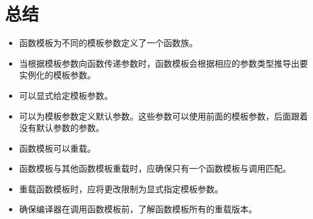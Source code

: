 \section{总结}

\begin{itemize}
\item
函数模板为不同的模板参数定义了一个函数族。

\item 
当根据模板参数向函数传递参数时，函数模板会根据相应的参数类型推导出要实例化的模板参数。

\item
可以显式给定模板参数。

\item 
可以为模板参数定义默认参数。这些参数可以使用前面的模板参数，后面跟着没有默认参数的参数。

\item
函数模板可以重载。

\item 
函数模板与其他函数模板重载时，应确保只有一个函数模板与调用匹配。

\item
重载函数模板时，应将更改限制为显式指定模板参数。

\item 
确保编译器在调用函数模板前，了解函数模板所有的重载版本。
\end{itemize}